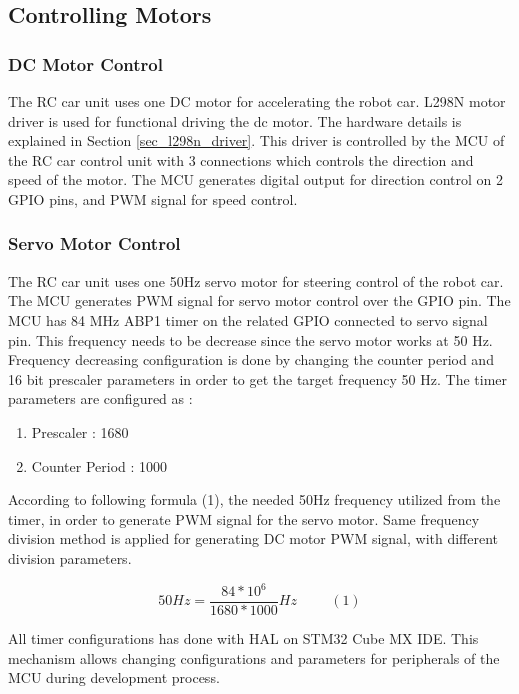 \subsection{Controlling Motors} \label{sec_controlling_motors}

\subsubsection{DC Motor Control} \label{sec_dc_motor_control}
The RC car unit uses one DC motor for accelerating the robot car. L298N motor driver is used for functional driving the dc motor. The hardware details is explained in Section \ref{sec_l298n_driver}. This driver is controlled by the MCU of the RC car control unit with 3 connections which controls the direction and speed of the motor. The MCU generates digital output for direction control on 2 GPIO pins, and PWM signal for speed control. \\

\subsubsection{Servo Motor Control} \label{sec_servo_motor_control}
The RC car unit uses one 50Hz servo motor for steering control of the robot car. The MCU generates PWM signal for servo motor control over the GPIO pin. The MCU has 84 MHz ABP1 timer on the related GPIO connected to servo signal pin. This frequency needs to be decrease since the servo motor works at 50 Hz. Frequency decreasing configuration is done by changing the counter period and 16 bit prescaler parameters in order to get the target frequency 50 Hz. The timer parameters are configured as :

\begin{enumerate}
    \item Prescaler : 1680
    \item Counter Period : 1000
\end{enumerate}

According to following formula (1), the needed 50Hz frequency utilized from the timer, in order to generate PWM signal for the servo motor. Same frequency division method is applied for generating DC motor PWM signal, with different division parameters.

\[50Hz = \frac{84*10^6}{1680*1000} Hz \hspace{1cm}(1)\]

All timer configurations has done with HAL on STM32 Cube MX IDE. This mechanism allows changing configurations and parameters for peripherals of the MCU during development process.


